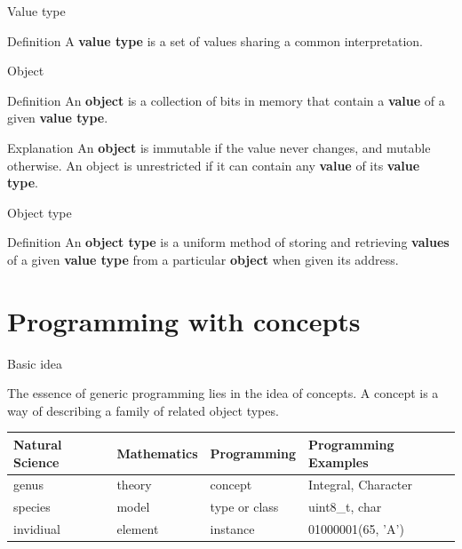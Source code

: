 \documentclass[10pt]{beamer}
\begin{document}
\begin{frame}[fragile]{Value type}
\begin{block}{Definition}
A \textbf{value type} is a set of values sharing a common interpretation.
\end{block}
\end{frame}

\begin{frame}[fragile]{Object}
\begin{block}{Definition}
An \textbf{object} is a collection of bits in memory that contain a \textbf{value} of a given \textbf{value type}.
\end{block}
\begin{block}{Explanation}
An \textbf{object} is immutable if the value never changes, and mutable otherwise. An object is unrestricted if it can contain any \textbf{value} of its \textbf{value type}.
\end{block}
\end{frame}


\begin{frame}[fragile]{Object type}
\begin{block}{Definition}
An \textbf{object type} is a uniform method of storing and retrieving \textbf{values} of a given \textbf{value type} from a particular \textbf{object} when given its address.
\end{block}
\end{frame}


\section{Programming with concepts}

\begin{frame}{Basic idea}
\begin{block}{}
The essence of generic programming lies in the idea of concepts. A concept is a way of describing a family of related object types.
\end{block}
\begin{center}
    \begin{tabular}{ | p{1.5cm} | l | l | p{3cm} |}
    \hline
    \textbf{Natural Science} & \textbf{Mathematics} & \textbf{Programming} & \textbf{Programming Examples} \\ \hline
      genus & theory & concept & Integral, Character \\
      species & model & type or class & uint8\_t, char \\
      invidiual & element & instance  & 01000001(65, 'A') \\
    \hline
    \end{tabular}
\end{center}
\end{frame}
\end{document}
